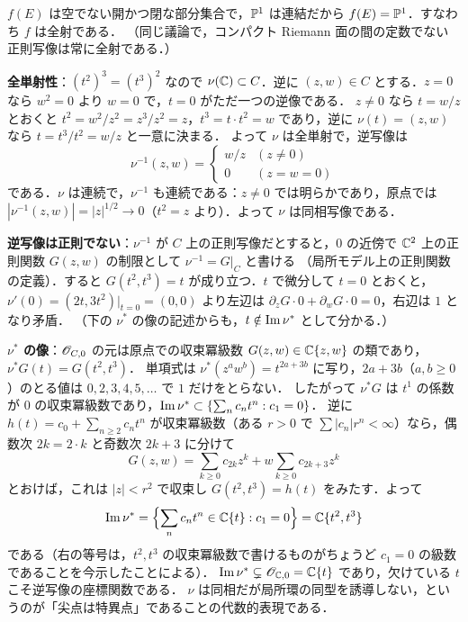 $f(E)$ は空でない開かつ閉な部分集合で，$\mathbb{P}^1$ は連結だから $f(E)=\mathbb{P}^1$．すなわち $f$ は全射である．
（同じ議論で，コンパクト Riemann 面の間の定数でない正則写像は常に全射である．）

\textbf{全単射性}：$(t^2)^3=(t^3)^2$ なので $\nu(\mathbb{C})\subset C$．逆に $(z,w)\in C$ とする．$z=0$ なら $w^2=0$ より $w=0$ で，$t=0$ がただ一つの逆像である．
$z\neq0$ なら $t=w/z$ とおくと $t^2=w^2/z^2=z^3/z^2=z$，$t^3=t\cdot t^2=w$ であり，逆に $\nu(t)=(z,w)$ なら $t=t^3/t^2=w/z$ と一意に決まる．
よって $\nu$ は全単射で，逆写像は
\begin{equation*}
  \nu^{-1}(z,w)=\begin{cases} w/z & (z\neq0)\\ 0 & (z=w=0)\end{cases}
\end{equation*}
である．$\nu$ は連続で，$\nu^{-1}$ も連続である：$z\neq0$ では明らかであり，原点では $|\nu^{-1}(z,w)|=|z|^{1/2}\to0$（$t^2=z$ より）．よって $\nu$ は同相写像である．

\textbf{逆写像は正則でない}：$\nu^{-1}$ が $C$ 上の正則写像だとすると，$0$ の近傍で $\mathbb{C}^2$ 上の正則関数 $G(z,w)$ の制限として $\nu^{-1}=G|_C$ と書ける
（局所モデル上の正則関数の定義）．すると $G(t^2,t^3)=t$ が成り立つ．$t$ で微分して $t=0$ とおくと，
$\nu'(0)=(2t,3t^2)|_{t=0}=(0,0)$ より左辺は $\partial_zG\cdot0+\partial_wG\cdot0=0$，右辺は $1$ となり矛盾．
（下の $\nu^*$ の像の記述からも，$t\notin\operatorname{Im}\nu^*$ として分かる．）

\textbf{$\nu^*$ の像}：$\mathscr{O}_{C,0}$ の元は原点での収束冪級数 $G(z,w)\in\mathbb{C}\{z,w\}$ の類であり，$\nu^*G(t)=G(t^2,t^3)$．
単項式は $\nu^*(z^aw^b)=t^{2a+3b}$ に写り，$2a+3b$（$a,b\geq0$）のとる値は $0,2,3,4,5,\dots$ で $1$ だけをとらない．
したがって $\nu^*G$ は $t^1$ の係数が $0$ の収束冪級数であり，$\operatorname{Im}\nu^*\subset\{\sum_n c_nt^n:c_1=0\}$．
逆に $h(t)=c_0+\sum_{n\geq2}c_nt^n$ が収束冪級数（ある $r>0$ で $\sum|c_n|r^n<\infty$）なら，偶数次 $2k=2\cdot k$ と奇数次 $2k+3$ に分けて
\begin{equation*}
  G(z,w) = \sum_{k\geq0}c_{2k}z^k + w\sum_{k\geq0}c_{2k+3}z^k
\end{equation*}
とおけば，これは $|z|<r^2$ で収束し $G(t^2,t^3)=h(t)$ をみたす．よって
\begin{equation*}
  \operatorname{Im}\nu^* = \Bigl\{\sum_n c_nt^n\in\mathbb{C}\{t\} : c_1=0\Bigr\} = \mathbb{C}\{t^2,t^3\}
\end{equation*}
である（右の等号は，$t^2,t^3$ の収束冪級数で書けるものがちょうど $c_1=0$ の級数であることを今示したことによる）．
$\operatorname{Im}\nu^*\subsetneq\mathscr{O}_{\mathbb{C},0}=\mathbb{C}\{t\}$ であり，欠けている $t$ こそ逆写像の座標関数である．
$\nu$ は同相だが局所環の同型を誘導しない，というのが「尖点は特異点」であることの代数的表現である．

